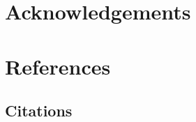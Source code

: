 \documentclass{sig-alternate}
\begin{document}
\section{Acknowledgements}

\section{References}

\subsection{Citations}


  
\end{document}
